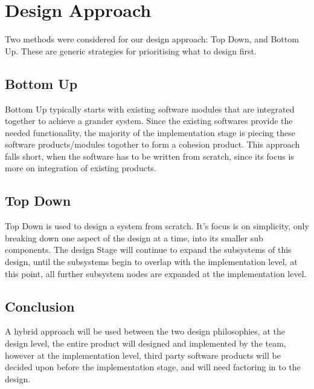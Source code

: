 \section{Design Approach}



Two methods were considered for our design approach: Top Down, and Bottom Up.
These are generic strategies for prioritising what to design first.

\subsection{Bottom Up}
Bottom Up typically starts with existing software modules that are integrated together to achieve a grander system.
Since the existing softwares provide the needed functionality, the majority of the implementation stage is piecing these software products/modules togother to form a cohesion product.
This approach falls short, when the software has to be written from scratch, since its focus is more on integration of existing products.

\subsection{Top Down}
Top Down is used to design a system from scratch.
It's focus is on simplicity, only breaking down one aspect of the design at a time, into its smaller sub components.
The design Stage will continue to expand the subsystems of this design, until the subsystems begin to overlap with the implementation level, at this point, all further subsystem nodes are expanded at the implementation level.

\subsection{Conclusion}
A hybrid approach will be used between the two design philosophies, at the design level, the  entire product will designed and implemented by the team, however at the implementation level, third party software products will be decided upon before the implementation stage, and will need factoring in to the design.
